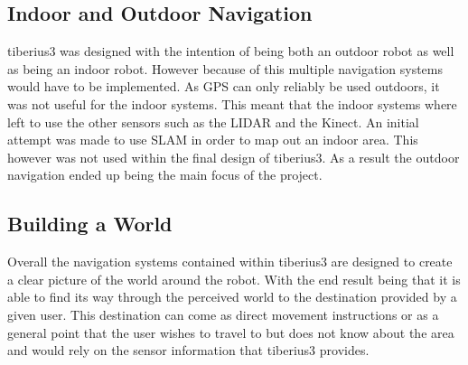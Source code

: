 \subsection{Indoor and Outdoor Navigation}
\gls{tiberius3} was designed with the intention of being both an outdoor robot as well as being an indoor robot. However because of this multiple navigation systems would have to be implemented. As \gls{GPS} can only reliably be used outdoors, it was not useful for the indoor systems. This meant that the indoor systems where left to use the other sensors such as the \gls{LIDAR} and the Kinect. An initial attempt was made to use \gls{SLAM} in order to map out an indoor area. This however was not used within the final design of \gls{tiberius3}. As a result the outdoor navigation ended up being the main focus of the project.

\subsection{Building a World}
Overall the navigation systems contained within \gls{tiberius3} are designed to create a clear picture of the world around the robot. With the end result being that it is able to find its way through the perceived world to the destination provided by a given user. This destination can come as direct movement instructions or as a general point that the user wishes to travel to but does not know about the area and would rely on the sensor information that \gls{tiberius3} provides.
